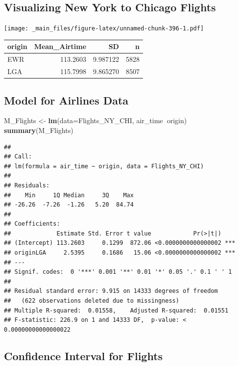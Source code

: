 \documentclass[]{book}
\newenvironment{Shaded}{\begin{snugshade}}{\end{snugshade}}
\newcommand{\KeywordTok}[1]{\textcolor[rgb]{0.13,0.29,0.53}{\textbf{#1}}}
\newcommand{\DataTypeTok}[1]{\textcolor[rgb]{0.13,0.29,0.53}{#1}}
\newcommand{\StringTok}[1]{\textcolor[rgb]{0.31,0.60,0.02}{#1}}
\newcommand{\OperatorTok}[1]{\textcolor[rgb]{0.81,0.36,0.00}{\textbf{#1}}}
\newcommand{\NormalTok}[1]{#1}
\begin{document}
\subsection{Visualizing New York to Chicago
Flights}\label{visualizing-new-york-to-chicago-flights}

\texttt{[image: \_main\_files/figure-latex/unnamed-chunk-396-1.pdf]}

\begin{tabular}{l|r|r|r}
\hline
origin & Mean\_Airtime & SD & n\\
\hline
EWR & 113.2603 & 9.987122 & 5828\\
\hline
LGA & 115.7998 & 9.865270 & 8507\\
\hline
\end{tabular}

\subsection{Model for Airlines Data}\label{model-for-airlines-data}

\begin{Shaded}
\begin{Highlighting}[]
\NormalTok{M_Flights <-}\StringTok{ }\KeywordTok{lm}\NormalTok{(}\DataTypeTok{data=}\NormalTok{Flights_NY_CHI, air_time}\OperatorTok{~}\NormalTok{origin)}
\KeywordTok{summary}\NormalTok{(M_Flights)}
\end{Highlighting}
\end{Shaded}

\begin{verbatim}
## 
## Call:
## lm(formula = air_time ~ origin, data = Flights_NY_CHI)
## 
## Residuals:
##    Min     1Q Median     3Q    Max 
## -26.26  -7.26  -1.26   5.20  84.74 
## 
## Coefficients:
##             Estimate Std. Error t value            Pr(>|t|)    
## (Intercept) 113.2603     0.1299  872.06 <0.0000000000000002 ***
## originLGA     2.5395     0.1686   15.06 <0.0000000000000002 ***
## ---
## Signif. codes:  0 '***' 0.001 '**' 0.01 '*' 0.05 '.' 0.1 ' ' 1
## 
## Residual standard error: 9.915 on 14333 degrees of freedom
##   (622 observations deleted due to missingness)
## Multiple R-squared:  0.01558,    Adjusted R-squared:  0.01551 
## F-statistic: 226.9 on 1 and 14333 DF,  p-value: < 0.00000000000000022
\end{verbatim}

\subsection{Confidence Interval for
Flights}\label{confidence-interval-for-flights}
\end{document}
